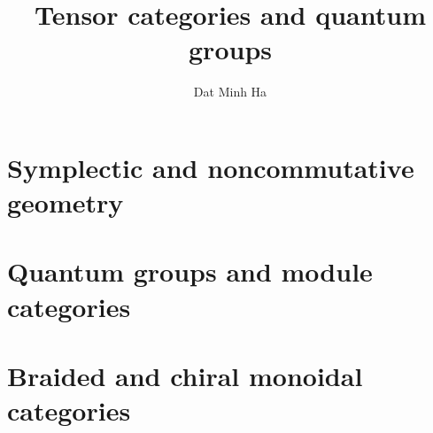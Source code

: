 

\setcounter{section}{-1}





	\title{Tensor categories and quantum groups}
	
	\author{Dat Minh Ha}
	\maketitle
	
	\begin{abstract}
	    
	\end{abstract}
	
	{
      \hypersetup{} 
      \dominitoc
      \tableofcontents %
    }
    
    \chapter{Symplectic and noncommutative geometry}
        \begin{abstract}
            
        \end{abstract}
        
        \minitoc
        
        
        
        
    
    \chapter{Quantum groups and module categories}
        \begin{abstract}
            
        \end{abstract}
        
        \minitoc
        
        
        
        
    
    \chapter{Braided and chiral monoidal categories}
        \begin{abstract}
            
        \end{abstract}
        
